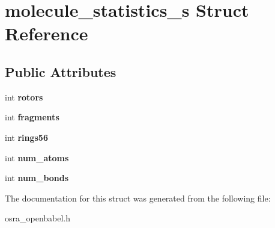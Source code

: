 \hypertarget{structmolecule__statistics__s}{\section{molecule\-\_\-statistics\-\_\-s Struct Reference}
\label{structmolecule__statistics__s}
}
\subsection*{Public Attributes}
\begin{DoxyCompactItemize}
\item 
\hypertarget{structmolecule__statistics__s_a3280f0a9c899229775e1df3508fbc495}{int {\bfseries rotors}}\label{structmolecule__statistics__s_a3280f0a9c899229775e1df3508fbc495}

\item 
\hypertarget{structmolecule__statistics__s_afaabd43b8e10ee9b927c9724b0504f72}{int {\bfseries fragments}}\label{structmolecule__statistics__s_afaabd43b8e10ee9b927c9724b0504f72}

\item 
\hypertarget{structmolecule__statistics__s_a65701780ab844a8ed777a77bb8b07da7}{int {\bfseries rings56}}\label{structmolecule__statistics__s_a65701780ab844a8ed777a77bb8b07da7}

\item 
\hypertarget{structmolecule__statistics__s_aee659e2179ad7411fe52dc0869a573fc}{int {\bfseries num\-\_\-atoms}}\label{structmolecule__statistics__s_aee659e2179ad7411fe52dc0869a573fc}

\item 
\hypertarget{structmolecule__statistics__s_ad904b4a9e2f1ccc3ea7ec360eff70ac6}{int {\bfseries num\-\_\-bonds}}\label{structmolecule__statistics__s_ad904b4a9e2f1ccc3ea7ec360eff70ac6}

\end{DoxyCompactItemize}


The documentation for this struct was generated from the following file\-:\begin{DoxyCompactItemize}
\item 
osra\-\_\-openbabel.\-h\end{DoxyCompactItemize}
